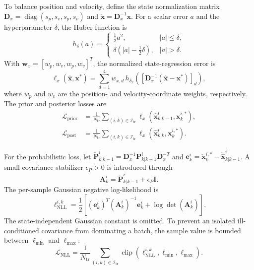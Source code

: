 \documentclass[10pt,doublecolumn]{IEEEtaes}
\begin{document}
To balance position and velocity, define the state normalization matrix $\mathbf{D}_x=\operatorname{diag}(s_p,s_v,s_p,s_v)$ and $\check{\mathbf{x}}=\mathbf{D}_x^{-1}\mathbf{x}$. For a scalar error $a$ and the hyperparameter $\delta$, the Huber function is
\begin{equation}
h_{\delta}(a)=
\begin{cases}
\frac{1}{2}a^2,& |a|\leq\delta,\\
\delta\left(|a|-\frac{1}{2}\delta\right),& |a|>\delta.
\end{cases}
\label{eq:huber_definition}
\end{equation}
With $\mathbf{w}_x=[w_p,w_v,w_p,w_v]^T$, the normalized state-regression error is
\begin{equation}
\ell_x(\hat{\mathbf{x}},\mathbf{x}^{*})=
\sum_{d=1}^{4}w_{x,d}\,
h_{\delta_x}\!\left(
[\mathbf{D}_x^{-1}(\hat{\mathbf{x}}-\mathbf{x}^{*})]_d
\right),
\label{eq:state_regression_error}
\end{equation}
where $w_p$ and $w_v$ are the position- and velocity-coordinate weights, respectively. The prior and posterior losses are
\begin{align}
\mathcal{L}_{\mathrm{prior}}
&=\frac{1}{N_{\mathrm{tr}}}
\sum_{(i,k)\in\mathcal{I}_{\mathrm{tr}}}
\ell_x(\hat{\mathbf{x}}_{k|k-1}^{i},\mathbf{x}_{k}^{i,*}),
\label{eq:prior_loss}\\
\mathcal{L}_{\mathrm{post}}
&=\frac{1}{N_{\mathrm{tr}}}
\sum_{(i,k)\in\mathcal{I}_{\mathrm{tr}}}
\ell_x(\hat{\mathbf{x}}_{k|k}^{i},\mathbf{x}_{k}^{i,*}).
\label{eq:posterior_loss}
\end{align}

For the probabilistic loss, let $\check{\mathbf{P}}_{k|k-1}^{i}=\mathbf{D}_x^{-1}\mathbf{P}_{k|k-1}^{i}\mathbf{D}_x^{-T}$ and $\mathbf{e}_k^i=\check{\mathbf{x}}_k^{i,*}-\check{\hat{\mathbf{x}}}_{k|k-1}^{i}$. A small covariance stabilizer $\epsilon_P>0$ is introduced through
\begin{equation}
\mathbf{A}_k^i=\check{\mathbf{P}}_{k|k-1}^{i}+\epsilon_P\mathbf{I}.
\end{equation}
The per-sample Gaussian negative log-likelihood is
\begin{equation}
\ell_{\mathrm{NLL}}^{i,k}=\frac{1}{2}\left[
(\mathbf{e}_k^i)^T(\mathbf{A}_k^i)^{-1}\mathbf{e}_k^i+
\log\det(\mathbf{A}_k^i)
\right].
\label{eq:nll_sample}
\end{equation}
The state-independent Gaussian constant is omitted. To prevent an isolated ill-conditioned covariance from dominating a batch, the sample value is bounded between $\ell_{\min}$ and $\ell_{\max}$:
\begin{equation}
\mathcal{L}_{\mathrm{NLL}}=
\frac{1}{N_{\mathrm{tr}}}
\sum_{(i,k)\in\mathcal{I}_{\mathrm{tr}}}
\operatorname{clip}(\ell_{\mathrm{NLL}}^{i,k},\ell_{\min},\ell_{\max}).
\label{eq:nll_loss}
\end{equation}
\end{document}
